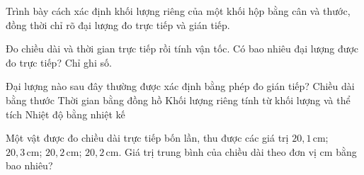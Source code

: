 

\begin{bt}
Trình bày cách xác định khối lượng riêng của một khối hộp bằng cân và thước, đồng thời chỉ rõ đại lượng đo trực tiếp và gián tiếp.
\end{bt}

\begin{ex}
Đo chiều dài và thời gian trực tiếp rồi tính vận tốc. Có bao nhiêu đại lượng được đo trực tiếp? Chỉ ghi số.
\end{ex}

\begin{ex}
Đại lượng nào sau đây thường được xác định bằng phép đo gián tiếp?
\choice
{Chiều dài bằng thước}
{Thời gian bằng đồng hồ}
{\True Khối lượng riêng tính từ khối lượng và thể tích}
{Nhiệt độ bằng nhiệt kế}
\end{ex}

\begin{ex}
Một vật được đo chiều dài trực tiếp bốn lần, thu được các giá trị $20,1\,\text{cm}$; $20,3\,\text{cm}$; $20,2\,\text{cm}$; $20,2\,\text{cm}$. Giá trị trung bình của chiều dài theo đơn vị cm bằng bao nhiêu?
\end{ex}


